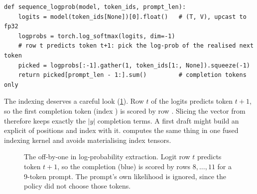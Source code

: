 \begin{lstlisting}[caption={Differentiable sequence log-probability. \texttt{gather} picks, for every position, the log-prob of the token that actually came next.},label={lst:grpo:seqlp}]
def sequence_logprob(model, token_ids, prompt_len):
    logits = model(token_ids[None])[0].float()   # (T, V), upcast to fp32
    logprobs = torch.log_softmax(logits, dim=-1)
    # row t predicts token t+1: pick the log-prob of the realised next token
    picked = logprobs[:-1].gather(1, token_ids[1:, None]).squeeze(-1)
    return picked[prompt_len - 1:].sum()         # completion tokens only
\end{lstlisting}

The indexing deserves a careful look (\cref{fig:grpo:shift}). Row $t$ of the logits
predicts token $t+1$, so the first completion token (index ) is scored by
row . Slicing the  vector from  therefore
keeps exactly the $|y|$ completion terms. A first draft might build an explicit
 of positions and index with it.  computes the same thing in
one fused indexing kernel and avoids materialising index tensors.

\begin{figure}[ht]
\centering
{}
\caption{The off-by-one in log-probability extraction. Logit row $t$ predicts token $t+1$,
so the completion (blue) is scored by rows $8,\dots,11$ for a 9-token prompt. The
prompt's own likelihood is ignored, since the policy did not choose those tokens.}
\label{fig:grpo:shift}
\end{figure}

